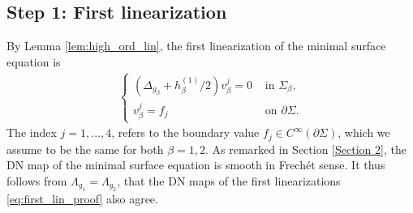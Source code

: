 \documentclass[12pt]{amsart}
\def\p{\partial}
\theoremstyle{definition}
\theoremstyle{remark}
\newcommand{\abs}[1]{\lvert #1 \rvert}
\newcommand{\eps}{\epsilon}
\begin{document}
\subsection{Step 1: First linearization}

By Lemma \ref{lem:high_ord_lin}, the first linearization of the minimal surface equation is  
\begin{equation}\label{eq:first_lin_proof}
	\begin{aligned}
		\begin{cases}
			(\Delta_{g_\beta}+h_{\beta}^{(1)}/2)v_\beta^{j}=0 
			& \text{ in } \Sigma_\beta,
			\\
			v_\beta^{j}=f_j
			&\text{ on }\p \Sigma.
		\end{cases}
	\end{aligned}
\end{equation}
 The index $j=1,\ldots,4$, refers to the boundary value $f_j\in C^\infty(\p \Sigma)$, which we assume to be the same for both $\beta=1,2$.  As remarked in Section \ref{Section 2}, the DN map of the minimal surface equation is smooth in Frech\'et sense. It thus follows from $\Lambda_{g_1}=\Lambda_{g_2}$, that the DN maps of the first linearizations \eqref{eq:first_lin_proof} also agree. 
 
\end{document}
